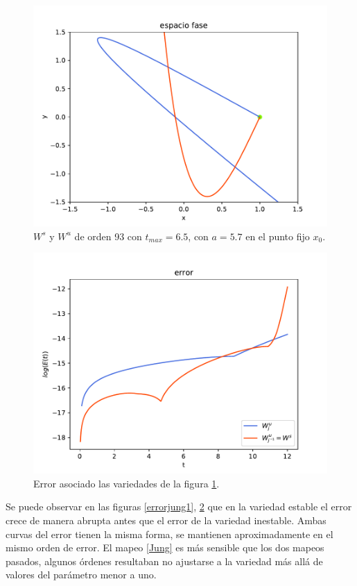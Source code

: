 \begin{figure}[H]
\centering
\includegraphics[scale=0.6]{jung57}
\caption{$W^{s}$ y $W^{u}$ de orden 93 con $t_{max}=6.5$, con $a=5.7$ en el punto fijo $x_{0}$.}
\label{jung2}
\end{figure}


\begin{figure}[H]
\centering
\includegraphics[scale=0.6]{error_jung57}
\caption{Error asociado las variedades de la figura \ref{jung2}.}
\label{errorjung2}
\end{figure}
Se puede observar en las figuras \ref{errorjung1}, \ref{errorjung2} que en la variedad estable el error crece de manera abrupta antes que el error de la variedad inestable. Ambas curvas del error tienen la misma forma, se mantienen aproximadamente en el mismo orden de error. El mapeo \eqref{Jung} es más sensible que los dos mapeos pasados, algunos órdenes resultaban no ajustarse a la variedad más allá de valores del parámetro menor a uno. 


